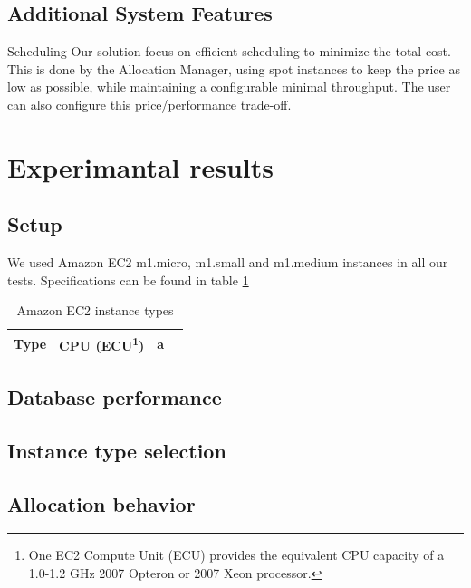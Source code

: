 \documentclass[a4paper]{IEEEtran}
\begin{document}
\subsection*{Additional System Features}

\begin{LaTeXdescription}
\item[Scheduling]
Our solution focus on efficient scheduling to minimize the total cost. This is done by the Allocation Manager, using spot instances to keep the price as low as possible, while maintaining a configurable minimal throughput.
The user can also configure this price/performance trade-off.

\end{LaTeXdescription}

\section{Experimantal results}

\subsection{Setup}

We used Amazon EC2 m1.micro, m1.small and m1.medium instances in all our tests. Specifications can be found in table \ref{amazoninstancespec}

\begin{table}
\centering
\begin{tabular}{| l | l | l | l |}
Type & CPU (ECU\footnote{One EC2 Compute Unit (ECU) provides the equivalent CPU capacity of a 1.0-1.2 GHz 2007 Opteron or 2007 Xeon processor.}) & a\\ \hline
\end{tabular}
\caption{Amazon EC2 instance types}
\label{amazoninstancespec}
\end{table}

\subsection{Database performance}

\subsection{Instance type selection}

\subsection{Allocation behavior}
\end{document}
